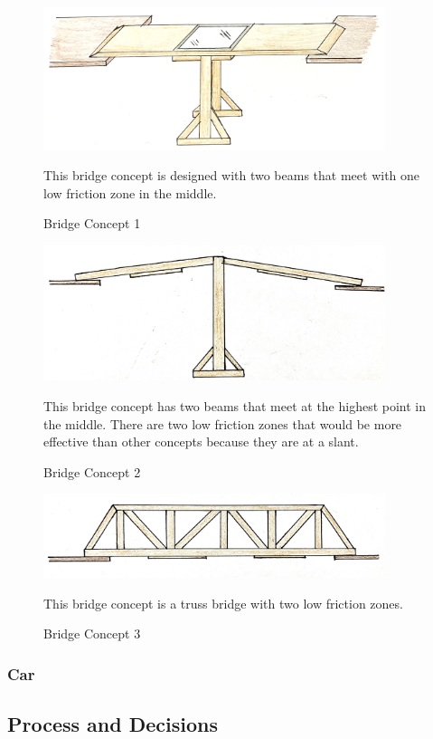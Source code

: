 \documentclass[fleqn,12pt]{project}
\begin{document}
\begin{figure}[h!]\centering
\includegraphics[width=10cm]{Bridge Concept 1.jpg}
\caption{Bridge Concept 1}
This bridge concept is designed with two beams that meet with one low friction zone in the middle. 
\label{fig:Fig1}
\end{figure}

\begin{figure}[h!]\centering
\includegraphics[width=10cm]{Bridge Concept 2.jpg}
\caption{Bridge Concept 2}
This bridge concept has two beams that meet at the highest point in the middle. There are two low friction zones that would be more effective than other concepts because they are at a slant.
\label{fig:Fig1}
\end{figure}

\begin{figure}[h!]\centering
\includegraphics[width=10cm]{Bridge Concept 3.jpg}
\caption{Bridge Concept 3}
This bridge concept is a truss bridge with two low friction zones.
\label{fig:Fig1}
\end{figure}

\subsubsection{Car}

\subsection{Process and Decisions}
\end{document}
